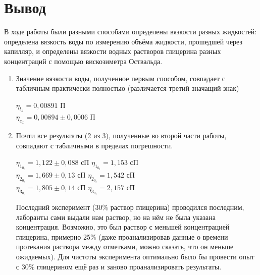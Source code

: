 \documentclass[a4paper]{article}
\begin{document}
\section{Вывод}
 В ходе работы были разными способами определены вязкости разных жидкостей: определена вязкость воды по измерению объёма жидкости, прошедшей через капилляр, и определены вязкости водных растворов глицерина разных концентраций  с помощью вискозиметра Оствальда.
 \begin{enumerate}
     \item Значение вязкости воды, полученное первым способом, совпадает с табличным практически полностью (различается третий значащий знак)
     \begin{center}
    $\eta_t_h = 0,00891$ П \hspace{1cm}\\ $\eta_e_x = 0,00894 \pm 0,0006$ П
    \end{center}
     \item Почти все результаты (2 из 3), полученные во второй части работы, совпадают с табличными в пределах погрешности.\\
     \begin{center}
     $\eta_1_0_e = 1,122 \pm 0,088$ сП \hspace{1cm} $\eta_1_0_t = 1,153$ сП\\
    $\eta_2_0_e = 1,669 \pm 0,13$ сП \hspace{1cm} $\eta_2_0_t = 1,542$ сП\\
    $\eta_3_0_e = 1,805 \pm 0,14$ сП \hspace{1cm} $\eta_3_0_t = 2,157$ сП\\
    \end{center}
     Последний эксперимент (30\% раствор глицерина) проводился последним, лаборанты сами выдали нам раствор, но на нём не была указана концентрация. Возможно, это был раствор с меньшей концентрацией глицерина, примерно 25\% (даже проанализировав данные о времени протекания раствора между отметками, можно сказать, что он меньше ожидаемых). Для чистоты эксперимента оптимально было бы провести опыт с 30\% глицерином ещё раз и заново проанализировать результаты.
 \end{enumerate}
\end{document}
